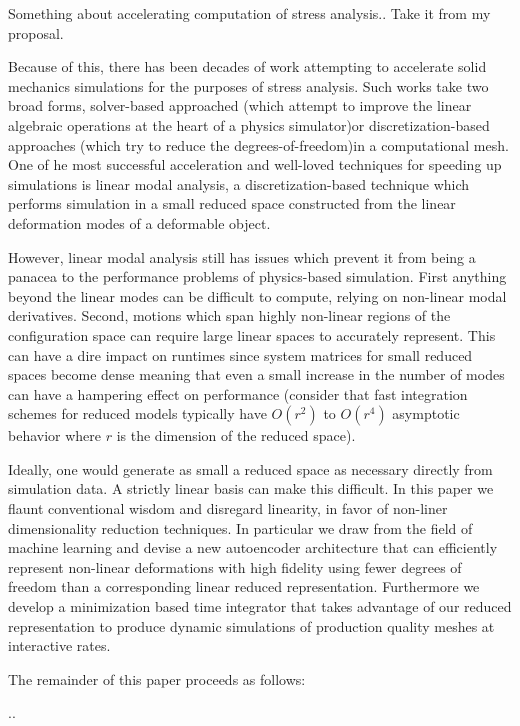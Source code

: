 Something about accelerating computation of stress analysis.. Take it from my proposal.

Because of this, there has been decades of work attempting to accelerate solid mechanics simulations for the purposes of stress analysis. Such works take two broad forms, solver-based approached (which attempt to improve the linear algebraic operations at the heart of a physics simulator)or discretization-based approaches (which try to reduce the degrees-of-freedom)in a computational mesh. One of he most successful acceleration and well-loved techniques for speeding up simulations is linear modal analysis, a discretization-based technique which performs simulation in a small reduced space constructed from the linear deformation modes of a deformable object. 

However, linear modal analysis still has issues which prevent it from being a panacea to the performance problems of physics-based simulation. First anything beyond the linear modes can be difficult to compute, relying on non-linear modal derivatives. Second, motions which span highly non-linear regions of the configuration space can require large linear spaces to accurately represent. This can have a dire impact on runtimes since system matrices for small reduced spaces become dense meaning that even a small increase in the number of modes can have a hampering effect on performance (consider that fast integration schemes for reduced models typically have $O(r^2)$ to $O(r^4)$ asymptotic behavior where $r$ is the dimension of the reduced space). 

Ideally, one would generate as small a reduced space as necessary directly from simulation data. A strictly linear basis can make this difficult. In this paper we flaunt conventional wisdom and disregard linearity, in favor of non-liner dimensionality reduction techniques. In particular we draw from the field of machine learning and devise a new autoencoder architecture that can efficiently represent non-linear deformations with high fidelity using fewer degrees of freedom than a corresponding linear reduced representation. Furthermore we develop a minimization based time integrator that takes advantage of our reduced representation to produce dynamic simulations of production quality meshes at interactive rates.

The remainder of this paper proceeds as follows: 

..